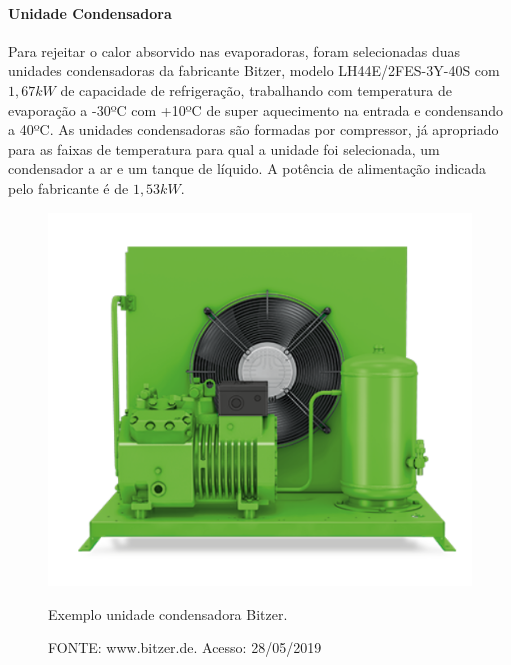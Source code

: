 \documentclass[10pt,a4paper]{article}
\begin{document}
\paragraph*{{ Unidade Condensadora}}


Para rejeitar o calor absorvido nas evaporadoras, foram selecionadas duas unidades condensadoras da fabricante Bitzer, modelo LH44E/2FES-3Y-40S com $1,67 kW$ de capacidade de refrigeração, trabalhando com temperatura de evaporação a -30ºC com +10ºC de super aquecimento na entrada e condensando a 40ºC. As unidades condensadoras são formadas por compressor, já apropriado para as faixas de temperatura para qual a unidade foi selecionada, um condensador a ar e um tanque de líquido. A potência de alimentação indicada pelo fabricante é de $1,53 kW$.

\begin{figure}[H]
    \centering
    \includegraphics[scale=0.6]{Figuras/unidade_condensadora_foto.PNG}
    \caption{Exemplo unidade condensadora Bitzer.}
    \caption*{FONTE: www.bitzer.de. Acesso: 28/05/2019}
    \label{fluxo_camara_ar}
\end{figure}
\end{document}
